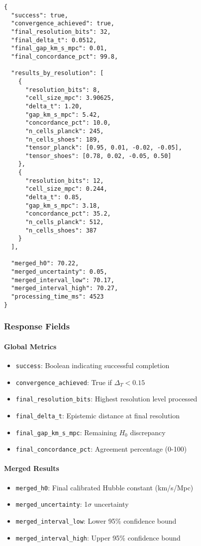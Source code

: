 \documentclass[11pt]{article}
\begin{document}
\begin{lstlisting}[style=json, caption={Complete response structure}]
{
  "success": true,
  "convergence_achieved": true,
  "final_resolution_bits": 32,
  "final_delta_t": 0.0512,
  "final_gap_km_s_mpc": 0.01,
  "final_concordance_pct": 99.8,

  "results_by_resolution": [
    {
      "resolution_bits": 8,
      "cell_size_mpc": 3.90625,
      "delta_t": 1.20,
      "gap_km_s_mpc": 5.42,
      "concordance_pct": 10.0,
      "n_cells_planck": 245,
      "n_cells_shoes": 189,
      "tensor_planck": [0.95, 0.01, -0.02, -0.05],
      "tensor_shoes": [0.78, 0.02, -0.05, 0.50]
    },
    {
      "resolution_bits": 12,
      "cell_size_mpc": 0.244,
      "delta_t": 0.85,
      "gap_km_s_mpc": 3.18,
      "concordance_pct": 35.2,
      "n_cells_planck": 512,
      "n_cells_shoes": 387
    }
  ],

  "merged_h0": 70.22,
  "merged_uncertainty": 0.05,
  "merged_interval_low": 70.17,
  "merged_interval_high": 70.27,
  "processing_time_ms": 4523
}
\end{lstlisting}

\subsubsection{Response Fields}

\paragraph{Global Metrics}
\begin{itemize}
    \item \texttt{success}: Boolean indicating successful completion
    \item \texttt{convergence\_achieved}: True if $\Delta_T < 0.15$
    \item \texttt{final\_resolution\_bits}: Highest resolution level processed
    \item \texttt{final\_delta\_t}: Epistemic distance at final resolution
    \item \texttt{final\_gap\_km\_s\_mpc}: Remaining $H_0$ discrepancy
    \item \texttt{final\_concordance\_pct}: Agreement percentage (0-100)
\end{itemize}

\paragraph{Merged Results}
\begin{itemize}
    \item \texttt{merged\_h0}: Final calibrated Hubble constant (km/s/Mpc)
    \item \texttt{merged\_uncertainty}: 1$\sigma$ uncertainty
    \item \texttt{merged\_interval\_low}: Lower 95\% confidence bound
    \item \texttt{merged\_interval\_high}: Upper 95\% confidence bound
\end{itemize}
\end{document}
